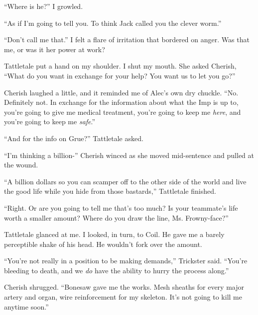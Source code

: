 





``Where is he?'' I growled.



``As if I'm going to tell you.  To think Jack called you the clever worm.''



``Don't call me that.''  I felt a flare of irritation that bordered on anger.  Was that me, or was it her power at work?



Tattletale put a hand on my shoulder.  I shut my mouth.  She asked Cherish, ``What do you want in exchange for your help?  You want us to let you go?''



Cherish laughed a little, and it reminded me of Alec's own dry chuckle.  ``No.  Definitely not.  In exchange for the information about what the Imp is up to, you're going to give me medical treatment, you're going to keep me \emph{here}, and you're going to keep me \emph{safe}.''



``And for the info on Grue?''  Tattletale asked.



``I'm thinking a billion-''  Cherish winced as she moved mid-sentence and pulled at the wound.



``A billion dollars so you can scamper off to the other side of the world and live the good life while you hide from those bastards,'' Tattletale finished.



``Right.  Or are you going to tell me that's too much?  Is your teammate's life worth a smaller amount?  Where do you draw the line, Ms. Frowny-face?''



Tattletale glanced at me.  I looked, in turn, to Coil.  He gave me a barely perceptible shake of his head.  He wouldn't fork over the amount.



``You're not really in a position to be making demands,'' Trickster said.  ``You're bleeding to death, and we \emph{do} have the ability to hurry the process along.''



Cherish shrugged.  ``Bonesaw gave me the works.  Mesh sheaths for every major artery and organ, wire reinforcement for my skeleton.  It's not going to kill me anytime soon.''



